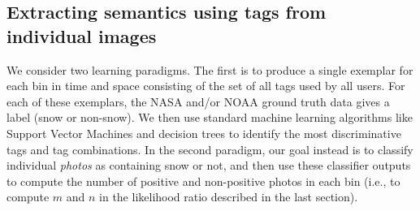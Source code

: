 %




\subsection{Extracting semantics using tags from individual images}

We consider two learning paradigms. The first
is to produce a single exemplar for each bin in time and space
consisting of the set of all tags used by all users. For each of these
exemplars, the NASA and/or NOAA ground truth data gives a label (snow
or non-snow). We then use standard machine learning algorithms like
Support Vector Machines and decision trees to identify the most
discriminative tags and tag combinations. In the second paradigm, our
goal instead is to classify individual \textit{photos} as containing
snow or not, and then use these classifier outputs to compute the
number of positive and non-positive photos in each bin (i.e., to
compute $m$ and $n$ in the likelihood ratio described in the last
section).







